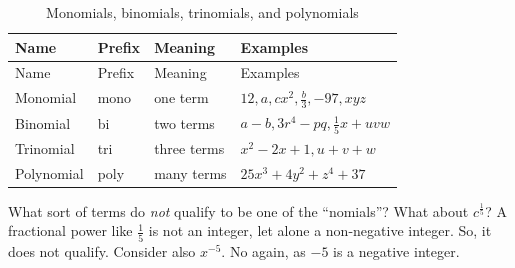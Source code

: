 \documentclass[
  a4paper,
]{article}
\begin{document}
\begin{longtable}[]{@{}
  >{\raggedright\arraybackslash}p{}
  >{\raggedright\arraybackslash}p{}
  >{\raggedright\arraybackslash}p{}
  >{\raggedright\arraybackslash}p{}@{}}
\caption{\label{tbl:nomials}Monomials, binomials, trinomials, and
polynomials}\tabularnewline
\toprule\noalign{}
\begin{minipage}[b]{\linewidth}\raggedright
Name
\end{minipage} & \begin{minipage}[b]{\linewidth}\raggedright
Prefix
\end{minipage} & \begin{minipage}[b]{\linewidth}\raggedright
Meaning
\end{minipage} & \begin{minipage}[b]{\linewidth}\raggedright
Examples
\end{minipage} \\
\midrule\noalign{}
\endfirsthead
\toprule\noalign{}
\begin{minipage}[b]{\linewidth}\raggedright
Name
\end{minipage} & \begin{minipage}[b]{\linewidth}\raggedright
Prefix
\end{minipage} & \begin{minipage}[b]{\linewidth}\raggedright
Meaning
\end{minipage} & \begin{minipage}[b]{\linewidth}\raggedright
Examples
\end{minipage} \\
\midrule\noalign{}
\endhead
\bottomrule\noalign{}
\endlastfoot
Monomial & mono & one term & \(12, a, cx^2, \frac{b}{3}, -97, xyz\) \\
Binomial & bi & two terms & \(a - b, 3r^4 - pq, \frac{1}{5}x + uvw\) \\
Trinomial & tri & three terms & \(x^2 - 2x + 1, u + v + w\) \\
Polynomial & poly & many terms & \(25x^3 + 4y^2 + z^4 + 37\) \\
\end{longtable}

What sort of terms do \emph{not} qualify to be one of the ``nomials''?
What about \(c^{\frac{1}{5}}\)? A fractional power like \(\frac{1}{5}\)
is not an integer, let alone a non-negative integer. So, it does not
qualify. Consider also \(x^{-5}\). No again, as \(-5\) is a negative
integer.
\end{document}
